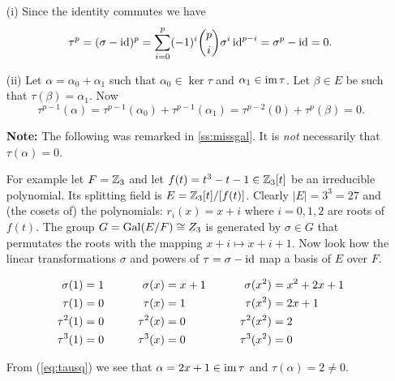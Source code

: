 \begin{myenumerate}
\begin{itemize}
 \item[(i)]
    Since the identity commutes we have
    \begin{equation} \label{eq:taupzero}
     \tau^p = (\sigma - \mathop{\rm id}\nolimits)^p =
     \sum_{i=0}^p (-1)^i\binom{p}{i}\sigma^i\mathop{\rm id}\nolimits^{p-i} = \sigma^p - \mathop{\rm id}\nolimits = 0.
    \end{equation}

 \item[(ii)]
    Let \(\alpha = \alpha_0 + \alpha_1\) such that
     \(\alpha_0\in \ker \tau\) and
     \(\alpha_1\in \mathop{\rm im}\nolimits \tau\).
     Let \(\beta\in E\) be such that \(\tau(\beta)=\alpha_1\).
     Now
     \begin{equation*}
      \tau^{p-1}(\alpha) = \tau^{p-1}(\alpha_0) + \tau^{p-1}(\alpha_1) =
         \tau^{p-2}(0) + \tau^p(\beta) = 0.
     \end{equation*}

     \textbf{Note:} The following was remarked in \ref{ss:missgal}.
     It is \emph{not} necessarily that \(\tau(\alpha) = 0\).

     For example let \(F=\mathbb{Z}_3\) and let \(f(t)=t^3-t-1\in\mathbb{Z}_3[t]\)
     be an irreducible polynomial. Its splitting field is
     \(E = \mathbb{Z}_3[t]/[f(t)]\).
     Clearly \(|E|=3^3=27\) and (the cosets of) the polynomials:
     \(r_i(x)=x+i\) where \(i=0,1,2\) are roots of \(f(t)\).
     The group \(G = \mathop{\rm Gal}\nolimits(E/F) \cong Z_3\) is generated by
     \(\sigma\in G\) that permutates the roots with the mapping
     \(x+i \mapsto x + i + 1\).
     Now look how the linear transformations \(\sigma\) and
     powers of \(\tau = \sigma - \mathop{\rm id}\nolimits\)
     map a basis of $E$ over $F$.

     \begin{alignat}{3}
     \sigma(1) &= 1 & \qquad \sigma(x) &= x+1 & \qquad \sigma(x^2) & = x^2+2x+1
                                                                       \notag\\
     \tau(1)   &= 0 & \qquad \tau(x)   &= 1   & \qquad \tau(x^2) & = 2x+1
                                                            \label{eq:tausq} \\
     \tau^2(1) &= 0 & \qquad \tau^2(x) &= 0   & \qquad \tau^2(x^2) & = 2
                                                                      \notag \\
     \tau^3(1) &= 0 & \qquad \tau^3(x) &= 0   & \qquad \tau^3(x^2) & = 0 \notag
     \end{alignat}

     From (\ref{eq:tausq}) we see that \(\alpha = 2x+1 \in \mathop{\rm im}\nolimits\tau\)
     and \(\tau(\alpha) = 2 \neq 0\).




\end{itemize}
\end{myenumerate}
